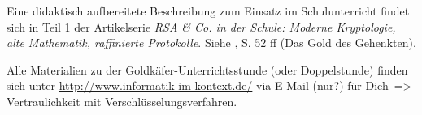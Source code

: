 \begin{refsegment}
\begin{description}
{	Eine didaktisch aufbereitete Beschreibung zum Einsatz im Schulunterricht findet
        sich in Teil 1 der Artikelserie {\em RSA \& Co. in der Schule:
        Moderne Kryptologie, alte Mathematik, raffinierte Protokolle}.
        Siehe \cite{Witten1998}, S. 52 ff (\glqq Das Gold des Gehenkten\grqq).

	Alle Materialien zu der Goldkäfer-Unterrichtsstunde (oder Doppelstunde)
	finden sich unter \url{http://www.informatik-im-kontext.de/} via
	\glqq E-Mail (nur?) für Dich\grqq~=> \glqq Vertraulichkeit mit Verschlüsselungsverfahren\grqq.

}
\end{description}
\end{refsegment}
